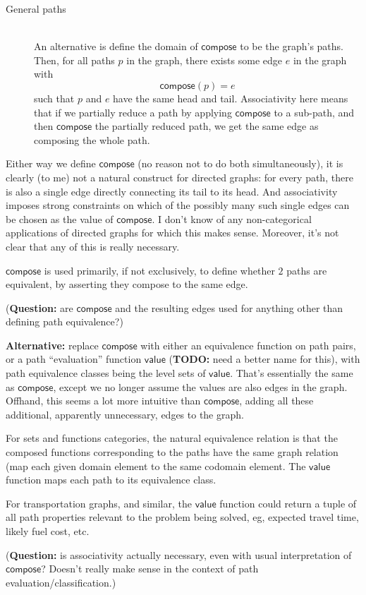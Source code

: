 \documentclass[11pt,openany]{article}
\begin{document}
\begin{description}
\begin{description}
\item[General paths]\mbox{}\\
An alternative is define the domain of $\mathsf{compose}$
to be the graph's paths. 
Then, for all paths $p$ in the graph,
there exists some edge $e$ in the graph
with 
\[ \mathsf{compose}(p) = e \]
such that 
$p$ and $e$ have the same head and tail.
Associativity here means that if we partially reduce a path
by applying $\mathsf{compose}$ to a sub-path,
and then $\mathsf{compose}$ the partially reduced path,
we get the same edge as composing the whole path.
\end{description}
\par
Either way we define $\mathsf{compose}$ (no reason not to do both
simultaneously), it is clearly (to me) not a natural construct
for directed graphs: for every path, there is also 
a single edge directly connecting its tail to its head.
And associativity imposes strong constraints on which of the possibly
many such single edges can be chosen as the value of $\mathsf{compose}$.
I don't know of any non-categorical applications of directed graphs
for which this makes sense.
Moreover, it's not clear that any of this is really necessary.
\par
$\mathsf{compose}$ is used primarily, if not exclusively,
to define whether $2$ paths are equivalent, by asserting they 
compose to the same edge.
\par
(\textbf{Question:} are $\mathsf{compose}$ and the resulting edges
used for anything other than defining path equivalence?)
\par
\textbf{Alternative:} replace $\mathsf{compose}$ with 
either an equivalence function on path pairs,
or a path ``evaluation'' function $\mathsf{value}$
(\textbf{TODO:} need a better name for this),
with path equivalence classes
being the level sets of $\mathsf{value}$.
That's essentially the same as $\mathsf{compose}$,
except we no longer assume the values are also edges in the graph.
Offhand, this seems a lot more intuitive than $\mathsf{compose}$,
adding all these additional, apparently unnecessary, edges to
the graph.
\par
For sets and functions categories, the natural equivalence relation
is that the composed functions corresponding to the paths 
have the same graph relation (map each given domain element to the 
same codomain element. The $\mathsf{value}$ function maps each path
to its equivalence class.
\par
For transportation graphs, and similar, the $\mathsf{value}$ 
function could return a tuple of all path properties relevant to
the problem being solved, eg,  expected travel time, likely fuel 
cost, etc.
\par
(\textbf{Question:} is associativity actually necessary,
even with usual interpretation of $\mathsf{compose}$?
Doesn't really make sense in the context of path evaluation/classification.)


\end{description}
\end{document}
